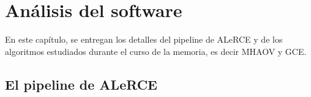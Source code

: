 
\chapter{Análisis del software}\label{chap:analisis}

En este capítulo, se entregan los detalles del pipeline de ALeRCE y de los algoritmos estudiados durante el curso de la memoria, es decir MHAOV y GCE.

\section{El pipeline de ALeRCE}\label{sec:alerce-pipeline}

